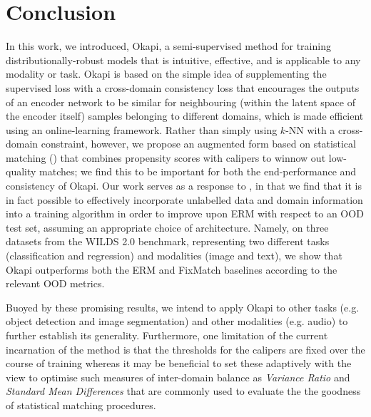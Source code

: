 \section{Conclusion}\label{sec:conclusion}
In this work, we introduced, Okapi, a semi-supervised method for training distributionally-robust
models that is intuitive, effective, and is applicable to any modality or task.
%
Okapi is based on the simple idea of supplementing the supervised loss with a cross-domain
consistency loss that encourages the outputs of an encoder network to be similar for neighbouring
(within the latent space of the encoder itself) samples  belonging to different domains, which is
made efficient using an online-learning framework.
%
Rather than simply using $k$-NN with a cross-domain constraint, however, we propose an augmented
form based on statistical matching (\CNN) that combines propensity scores with calipers to winnow
out low-quality matches; we find this to be important for both the end-performance and consistency
of Okapi.
%
Our work serves as a response to \cite{SagWeiLeeGaoetal22}, in that we find that it is in fact
possible to effectively incorporate unlabelled data and domain information into a training
algorithm in order to improve upon ERM with respect to an OOD test set, assuming an appropriate
choice of architecture.
%
Namely, on three datasets from the WILDS 2.0 benchmark, representing two different tasks
(classification and regression) and modalities (image and text), we show that Okapi outperforms
both the ERM and FixMatch baselines according to the relevant OOD metrics.
%

Buoyed by these promising results, we intend to apply Okapi to other tasks (e.g. object detection
and image segmentation) and other modalities (e.g. audio) to further establish its generality.
%
Furthermore, one limitation of the current incarnation of the method is that the thresholds for the
calipers are fixed over the course of training whereas it may be beneficial to set these adaptively
with the view to optimise such measures of inter-domain balance as \emph{Variance Ratio} and
\emph{Standard Mean Differences} that are commonly used to evaluate the the goodness of statistical
matching procedures.
